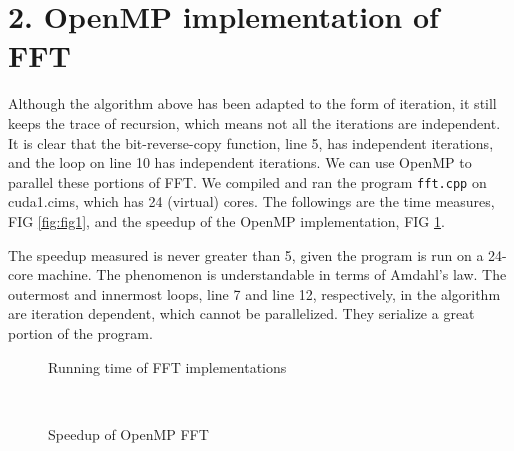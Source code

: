 \documentclass[amsmath,amssymb]{revtex4}
\begin{document}
\section{\label{sec:sec2}2. OpenMP implementation of FFT}
Although the algorithm above has been adapted to the form of iteration, it still keeps the trace of recursion, which means not all the iterations are independent. It is clear that the bit-reverse-copy function, line 5, has independent iterations, and the loop on line 10 has independent iterations. We can use OpenMP to parallel these portions of FFT. We compiled and ran the program {\tt fft.cpp} on cuda1.cims, which has 24 (virtual) cores. The followings are the time measures, FIG \ref{fig:fig1}, and the speedup of the OpenMP implementation, FIG \ref{fig:fig2}.

The speedup measured is never greater than 5, given the program is run on a 24-core machine. The phenomenon is understandable in terms of Amdahl's law. The outermost and innermost loops, line 7 and line 12, respectively, in the algorithm are iteration dependent, which cannot be parallelized. They serialize a great portion of the program.

\begin{figure}[h]
  \centering
  \begin{minipage}[b]{0.45\textwidth}

\caption{\label{fig:fig1}Running time of FFT implementations}
\end{minipage}
~
\begin{minipage}[b]{0.45\textwidth}
\caption{\label{fig:fig2}Speedup of OpenMP FFT}
\end{minipage}
\end{figure}
\end{document}
